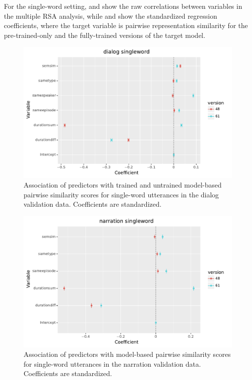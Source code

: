 For the single-word setting, 
 and  show the raw
correlations between variables in the multiple RSA analysis, while
 and  show the
standardized regression coefficients, where the target variable is
pairwise representation similarity for the pre-trained-only and the
fully-trained versions of the target model.



\begin{figure}
  \centering
  \includegraphics[scale=0.66]{results/grsa_dialog_word_coef.pdf}
  \caption{Association of predictors with trained and untrained
    model-based pairwise similarity scores for single-word utterances
    in the dialog validation data. Coefficients are standardized.}
  \label{fig:coef_word_dialog}
\end{figure}

\begin{figure}
  \centering
  \includegraphics[scale=0.66]{results/grsa_narration_word_coef.pdf}
  \caption{Association of predictors with 
    model-based pairwise similarity scores for single-word utterances
    in the narration validation data. Coefficients are standardized.}
  \label{fig:coef_word_narration}
\end{figure}


